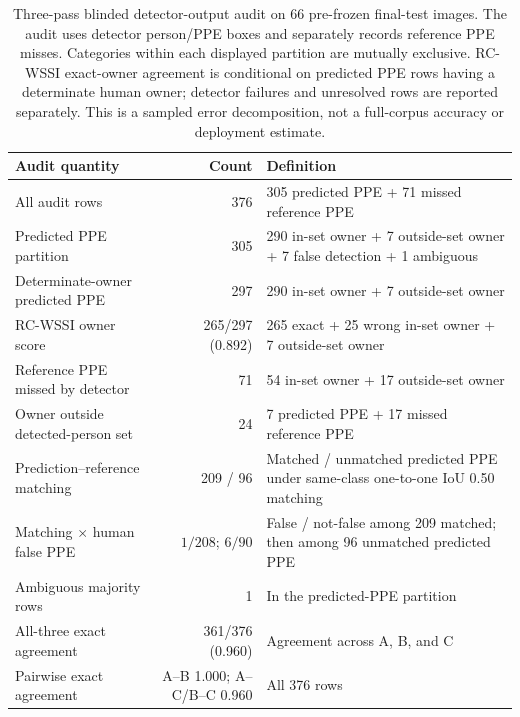 \documentclass[iicol,pdflatex,sn-mathphys-num]{sn-jnl}
\begin{document}
\begin{table}[t]
\caption{Three-pass blinded detector-output audit on 66 pre-frozen final-test images. The audit uses detector person/PPE boxes and separately records reference PPE misses. Categories within each displayed partition are mutually exclusive. RC-WSSI exact-owner agreement is conditional on predicted PPE rows having a determinate human owner; detector failures and unresolved rows are reported separately. This is a sampled error decomposition, not a full-corpus accuracy or deployment estimate.}
\label{tab:endtoendaudit}
\centering
\scriptsize
\setlength{\tabcolsep}{4pt}
\begin{tabular}{@{}p{} r p{}@{}}
\toprule
Audit quantity & Count & Definition \\
\midrule
All audit rows & 376 & 305 predicted PPE + 71 missed reference PPE \\
Predicted PPE partition & 305 & 290 in-set owner + 7 outside-set owner + 7 false detection + 1 ambiguous \\
Determinate-owner predicted PPE & 297 & 290 in-set owner + 7 outside-set owner \\
RC-WSSI owner score & 265/297 (0.892) & 265 exact + 25 wrong in-set owner + 7 outside-set owner \\
Reference PPE missed by detector & 71 & 54 in-set owner + 17 outside-set owner \\
Owner outside detected-person set & 24 & 7 predicted PPE + 17 missed reference PPE \\
Prediction--reference matching & 209 / 96 & Matched / unmatched predicted PPE under same-class one-to-one IoU 0.50 matching \\
Matching $\times$ human false PPE & $1/208$; $6/90$ & False / not-false among 209 matched; then among 96 unmatched predicted PPE \\
Ambiguous majority rows & 1 & In the predicted-PPE partition \\
All-three exact agreement & 361/376 (0.960) & Agreement across A, B, and C \\
Pairwise exact agreement & A--B 1.000; A--C/B--C 0.960 & All 376 rows \\
\bottomrule
\end{tabular}
\end{table}
\end{document}
